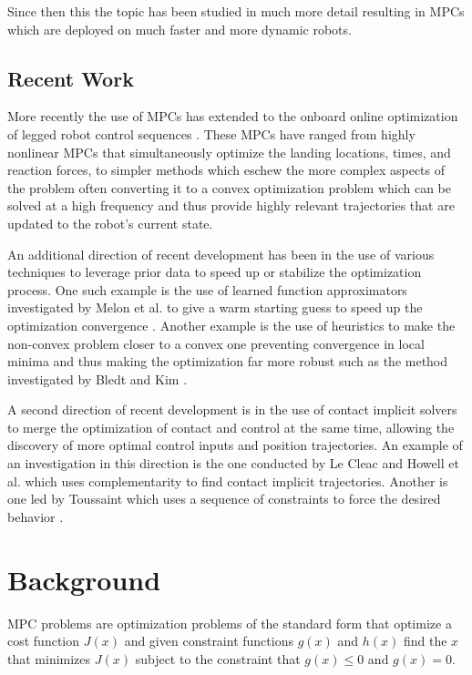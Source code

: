 \documentclass[conference]{IEEEtran}
\begin{document}
Since then this the topic has been studied in much more detail resulting in MPCs which are deployed on much faster and more dynamic robots.

\subsection{Recent Work}

More recently the use of MPCs has extended to the onboard online optimization of legged robot control sequences \cite{erez_integrated_2013}.
These MPCs have ranged from highly nonlinear MPCs that simultaneously optimize the landing locations, times, and reaction forces, to simpler methods which eschew the more complex aspects of the problem often converting it to a convex optimization problem which can be solved at a high frequency and thus provide highly relevant trajectories that are updated to the robot's current state.

An additional direction of recent development has been in the use of various techniques to leverage prior data to speed up or stabilize the optimization process.
One such example is the use of learned function approximators investigated by Melon et al. to give a warm starting guess to speed up the optimization convergence \cite{melon_receding-horizon_2021}.
Another example is the use of heuristics to make the non-convex problem closer to a convex one preventing convergence in local minima and thus making the optimization far more robust such as the method investigated by Bledt and Kim \cite{bledt_extracting_2020}.

A second direction of recent development is in the use of contact implicit solvers to merge the optimization of contact and control at the same time, allowing the discovery of more optimal control inputs and position trajectories.
An example of an investigation in this direction is the one conducted by Le Cleac and Howell et al. \cite{cleach_fast_2023} which uses complementarity to find contact implicit trajectories.
Another is one led by Toussaint which uses a sequence of constraints to force the desired behavior \cite{toussaint_sequence--constraints_2022}.

\section{Background}
\label{sec:background}

MPC problems are optimization problems of the standard form that optimize a cost function \(J(x)\) and given constraint functions \(g(x)\) and \(h(x)\) find the \(x\) that minimizes \(J(x)\) subject to the constraint that \(g(x)\leq0\) and \(g(x)=0\).
\end{document}
